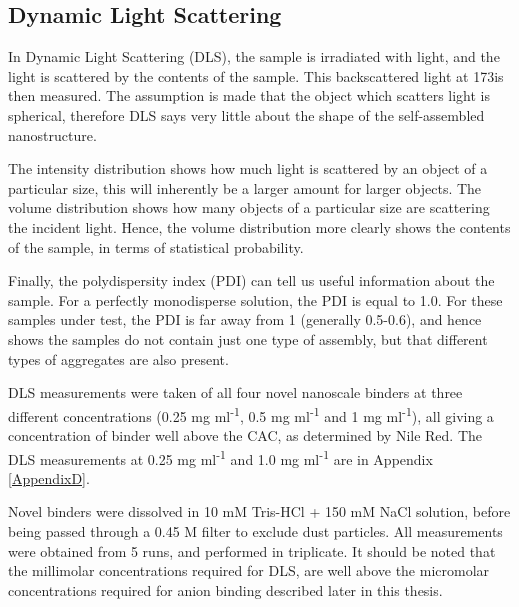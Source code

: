 \subsection{Dynamic Light Scattering}
In Dynamic Light Scattering (DLS), the sample is irradiated with light, and the light is scattered by the contents of the sample. This backscattered light at 173\textdegree \space is then measured.  The assumption is made that the object which scatters light is spherical, therefore DLS says very little about the shape of the self-assembled nanostructure. 

The intensity distribution shows how much light is scattered by an object of a particular size, this will inherently be a larger amount for larger objects. The volume distribution shows how many objects of a particular size are scattering the incident light. Hence, the volume distribution more clearly shows the contents of the sample, in terms of statistical probability.

Finally, the polydispersity index (PDI) can tell us useful information about the sample. For a perfectly monodisperse solution, the PDI is equal to 1.0. For these samples under test, the PDI is far away from 1 (generally 0.5-0.6), and hence shows the samples do not contain just one type of assembly, but that different types of aggregates are also present. 

DLS measurements were taken of all four novel nanoscale binders at three different concentrations (0.25 mg ml\textsuperscript{-1}, 0.5 mg ml\textsuperscript{-1} and 1 mg ml\textsuperscript{-1}), all giving a concentration of binder well above the CAC, as determined by Nile Red. The DLS measurements at 0.25 mg ml\textsuperscript{-1} and 1.0 mg ml\textsuperscript{-1} are in Appendix \ref{AppendixD}.

Novel binders were dissolved in 10 mM Tris-HCl + 150 mM NaCl solution, before being passed through a 0.45 \textmu M filter to exclude dust particles. All measurements were obtained from 5 runs, and performed in triplicate. It should be noted that the millimolar concentrations required for DLS, are well above the micromolar concentrations required for anion binding described later in this thesis.

